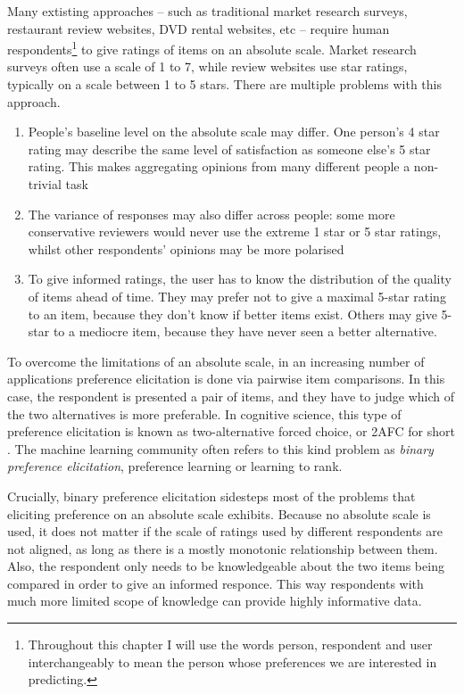 Many extisting approaches -- such as traditional market research surveys, restaurant review websites, DVD rental websites, etc -- require human respondents\footnote{Throughout this chapter I will use the words person, respondent and user interchangeably to mean the person whose preferences we are interested in predicting.} to give ratings of items on an absolute scale. Market research surveys often use a scale of 1 to 7, while review websites use star ratings, typically on a scale between 1 to 5 stars. There are multiple problems with this approach.
\begin{enumerate}
	\item People's baseline level on the absolute scale may differ. One person's 4 star rating may describe the same level of satisfaction as someone else's 5 star rating. This makes aggregating opinions from many different people a non-trivial task
	\item The variance of responses may also differ across people: some more conservative reviewers would never use the extreme 1 star or 5 star ratings, whilst other respondents' opinions may be more polarised
	\item To give informed ratings, the user has to know the distribution of the quality of items ahead of time. They may prefer not to give a maximal 5-star rating to an item, because they don't know if better items exist. Others may give 5-star to a mediocre item, because they have never seen a better alternative.
\end{enumerate} 

To overcome the limitations of an absolute scale, in an increasing number of applications preference elicitation is done via pairwise item comparisons. In this case, the respondent is presented a pair of items, and they have to judge which of the two alternatives is more preferable. In cognitive science, this type of preference elicitation is known as two-alternative forced choice, or 2AFC for short \citep{2AFC}. The machine learning community often refers to this kind problem as \emph{binary preference elicitation}, preference learning or learning to rank.

Crucially, binary preference elicitation sidesteps most of the problems that eliciting preference on an absolute scale exhibits. Because no absolute scale is used, it does not matter if the scale of ratings used by different respondents are not aligned, as long as there is a mostly monotonic relationship between them. Also, the respondent only needs to be knowledgeable about the two items being compared in order to give an informed responce. This way respondents with much more limited scope of knowledge can provide highly informative data.

